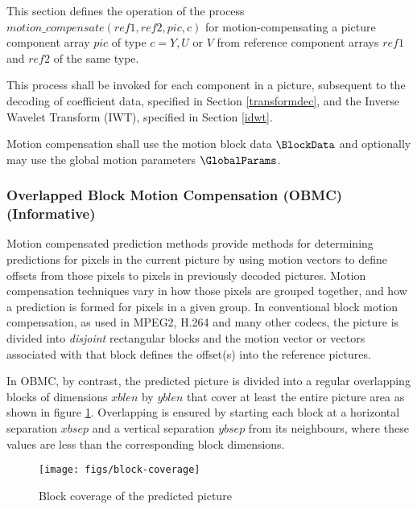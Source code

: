 \label{motioncompensate}

This section defines the operation of the process
$motion\_compensate(ref1, ref2,  pic, c)$ for motion-compensating a
picture component array  $pic$ of type $c=Y, U$ or $V$ from reference 
component arrays $ref1$ and $ref2$ of the same type.

This process shall be invoked for each component in a picture, subsequent to the 
decoding of coefficient data, specified in Section \ref{transformdec}, and the Inverse Wavelet Transform (IWT), specified in Section \ref{idwt}. 

Motion compensation shall use the motion block data $\BlockData$ and optionally may use the
global motion parameters $\GlobalParams$.

\begin{informative*}
\subsubsection{Overlapped Block Motion Compensation (OBMC) (Informative)}

Motion compensated prediction methods provide methods for determining 
predictions for pixels in the current picture by using motion vectors to 
define offsets from those pixels to pixels in previously decoded
pictures. Motion compensation techniques vary in how those pixels are grouped
together, and how a prediction is formed for pixels in a given group. In 
conventional  block motion compensation, as used in MPEG2, H.264 and many other
codecs, the picture is divided into {\em disjoint} rectangular blocks and the
motion vector or vectors associated with that block defines the offset(s) into
the reference pictures.

In OBMC, by contrast, the predicted picture is divided into a regular overlapping 
blocks of dimensions $xblen$ by $yblen$ that cover at least the entire picture 
area as shown in figure \ref{fig:blockcoverage}.  Overlapping is ensured by starting
each block at a horizontal separation $xbsep$ and a vertical separation $ybsep$ 
from its neighbours, where these values are less than the corresponding block dimensions.
\end{informative*}

\begin{figure}[!ht]
\centering
\texttt{[image: figs/block-coverage]}
\caption{Block coverage of the predicted picture}
\label{fig:blockcoverage}
\end{figure}

